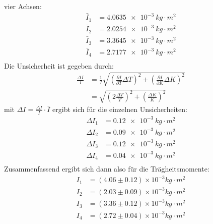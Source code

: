 \documentclass{report}
\begin{document}
vier Achsen:
\begin{equation}
    \begin{split}
        \bar{I}_1 &= \qty{4.0635e-3}{kg \cdot m^2} \\
        \bar{I}_2 &= \qty{2.0254e-3}{kg \cdot m^2} \\
        \bar{I}_3 &= \qty{3.3645e-3}{kg \cdot m^2} \\
        \bar{I}_4 &= \qty{2.7177e-3}{kg \cdot m^2} \\
    \end{split}
\end{equation}
Die Unsicherheit ist gegeben durch:
\begin{equation}
    \begin{split}
        \frac{\Delta I}{I} &= \frac{1}{I} \sqrt{\left(\frac{\partial I}{\partial T} \Delta T\right)^2 + \left(\frac{\partial I}{\partial K}\Delta K\right)^2} \\
                           &= \sqrt{\left(2\frac{\Delta T}{T}\right)^2 + \left(\frac{\Delta K}{K}\right)^2}
    \end{split}
    \label{eq:TraegeitsmomentUnsicherheit}
\end{equation}
mit $\Delta I = \frac{\Delta I}{I} \cdot \bar{I}$ ergibt sich für die einzelnen Unsicherheiten:
\begin{equation}
    \begin{split}
        \Delta I_1 &= \qty{0.12e-3}{kg \cdot m^2} \\
        \Delta I_2 &= \qty{0.09e-3}{kg \cdot m^2} \\
        \Delta I_3 &= \qty{0.12e-3}{kg \cdot m^2} \\
        \Delta I_4 &= \qty{0.04e-3}{kg \cdot m^2} \\
    \end{split}
\end{equation}
Zusammenfassend ergibt sich dann also für die Trägheitsmomente:
\begin{equation}
    \boxed{
        \begin{aligned}
        I_1 &= (4.06 \pm 0.12) \times 10^{-3} \si{kg \cdot m^2} \\
        I_2 &= (2.03 \pm 0.09) \times 10^{-3} \si{kg \cdot m^2} \\
        I_3 &= (3.36 \pm 0.12) \times 10^{-3} \si{kg \cdot m^2} \\
        I_4 &= (2.72 \pm 0.04) \times 10^{-3} \si{kg \cdot m^2}
        \end{aligned}
    }
    \label{eq:TraegeitsmomenteExp}
\end{equation}
\end{document}
